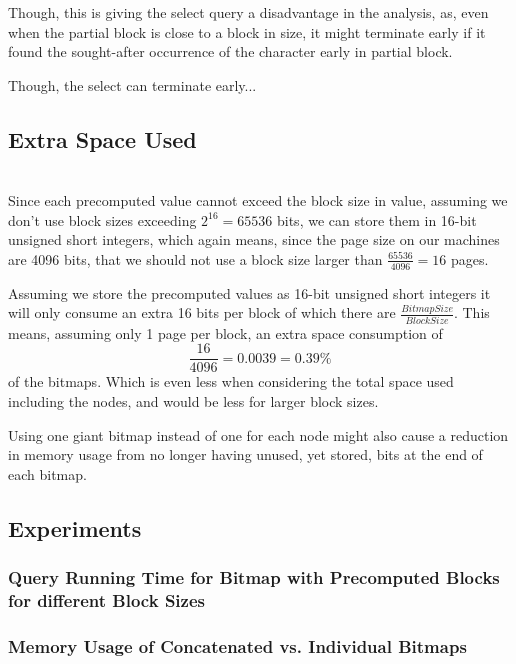Though, this is giving the select query a disadvantage in the analysis, as, even when the partial block is close to a block in size, it might terminate early if it found the sought-after occurrence of the character early in partial block.

Though, the select can terminate early...



\subsection{Extra Space Used}~\\
Since each precomputed value cannot exceed the block size in value, assuming we don't use block sizes exceeding $2^{16} = 65536$ bits, we can store them in 16-bit unsigned short integers, which again means, since the page size on our machines are 4096 bits, that we should not use a block size larger than $\frac{65536}{4096} = 16$ pages.

Assuming we store the precomputed values as 16-bit unsigned short integers it will only consume an extra 16 bits per block of which there are $\frac{BitmapSize}{BlockSize}$.
This means, assuming only 1 page per block, an extra space consumption of
\[ \frac{16}{4096} = 0.0039 = 0.39\% \]
of the bitmaps.
Which is even less when considering the total space used including the nodes, and would be less for larger block sizes.

Using one giant bitmap instead of one for each node might also cause a reduction in memory usage from no longer having unused, yet stored, bits at the end of each bitmap.


\subsection{Experiments}
\subsubsection{Query Running Time for Bitmap with Precomputed Blocks for different Block Sizes}

\subsubsection{Memory Usage of Concatenated vs. Individual Bitmaps}
